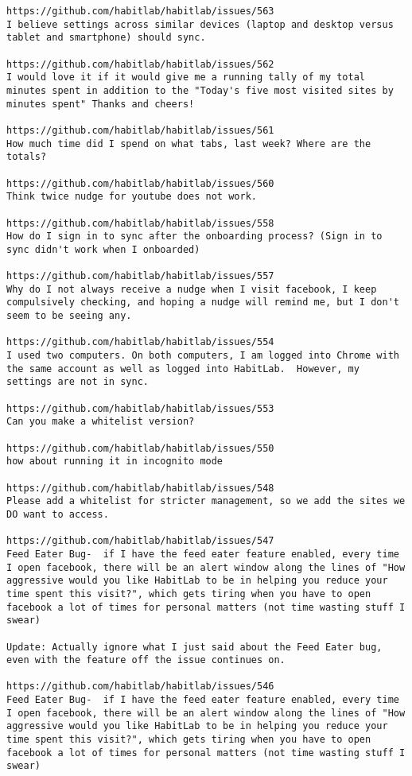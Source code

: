 \begin{lstlisting}[breaklines]
https://github.com/habitlab/habitlab/issues/563
I believe settings across similar devices (laptop and desktop versus tablet and smartphone) should sync.

https://github.com/habitlab/habitlab/issues/562
I would love it if it would give me a running tally of my total minutes spent in addition to the "Today's five most visited sites by minutes spent" Thanks and cheers!

https://github.com/habitlab/habitlab/issues/561
How much time did I spend on what tabs, last week? Where are the totals?

https://github.com/habitlab/habitlab/issues/560
Think twice nudge for youtube does not work.

https://github.com/habitlab/habitlab/issues/558
How do I sign in to sync after the onboarding process? (Sign in to sync didn't work when I onboarded)

https://github.com/habitlab/habitlab/issues/557
Why do I not always receive a nudge when I visit facebook, I keep compulsively checking, and hoping a nudge will remind me, but I don't seem to be seeing any.

https://github.com/habitlab/habitlab/issues/554
I used two computers. On both computers, I am logged into Chrome with the same account as well as logged into HabitLab.  However, my settings are not in sync.

https://github.com/habitlab/habitlab/issues/553
Can you make a whitelist version?

https://github.com/habitlab/habitlab/issues/550
how about running it in incognito mode

https://github.com/habitlab/habitlab/issues/548
Please add a whitelist for stricter management, so we add the sites we DO want to access.

https://github.com/habitlab/habitlab/issues/547
Feed Eater Bug-  if I have the feed eater feature enabled, every time I open facebook, there will be an alert window along the lines of "How aggressive would you like HabitLab to be in helping you reduce your time spent this visit?", which gets tiring when you have to open facebook a lot of times for personal matters (not time wasting stuff I swear)

Update: Actually ignore what I just said about the Feed Eater bug, even with the feature off the issue continues on.

https://github.com/habitlab/habitlab/issues/546
Feed Eater Bug-  if I have the feed eater feature enabled, every time I open facebook, there will be an alert window along the lines of "How aggressive would you like HabitLab to be in helping you reduce your time spent this visit?", which gets tiring when you have to open facebook a lot of times for personal matters (not time wasting stuff I swear)


\end{lstlisting}
